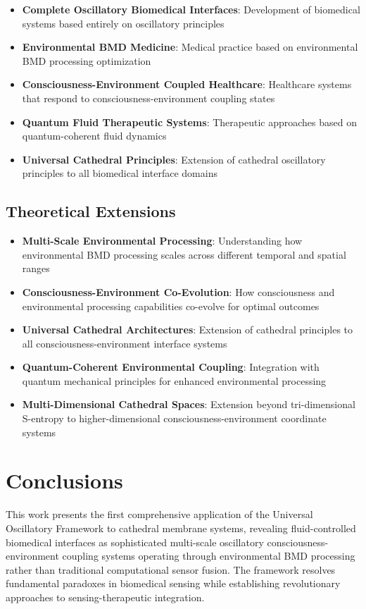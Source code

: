 \documentclass[12pt,a4paper]{article}
\begin{document}
\begin{itemize}
\item \textbf{Complete Oscillatory Biomedical Interfaces}: Development of biomedical systems based entirely on oscillatory principles
\item \textbf{Environmental BMD Medicine}: Medical practice based on environmental BMD processing optimization
\item \textbf{Consciousness-Environment Coupled Healthcare}: Healthcare systems that respond to consciousness-environment coupling states
\item \textbf{Quantum Fluid Therapeutic Systems}: Therapeutic approaches based on quantum-coherent fluid dynamics
\item \textbf{Universal Cathedral Principles}: Extension of cathedral oscillatory principles to all biomedical interface domains
\end{itemize}

\subsection{Theoretical Extensions}

\begin{itemize}
\item \textbf{Multi-Scale Environmental Processing}: Understanding how environmental BMD processing scales across different temporal and spatial ranges
\item \textbf{Consciousness-Environment Co-Evolution}: How consciousness and environmental processing capabilities co-evolve for optimal outcomes
\item \textbf{Universal Cathedral Architectures}: Extension of cathedral principles to all consciousness-environment interface systems
\item \textbf{Quantum-Coherent Environmental Coupling}: Integration with quantum mechanical principles for enhanced environmental processing
\item \textbf{Multi-Dimensional Cathedral Spaces}: Extension beyond tri-dimensional S-entropy to higher-dimensional consciousness-environment coordinate systems
\end{itemize}

\section{Conclusions}

This work presents the first comprehensive application of the Universal Oscillatory Framework to cathedral membrane systems, revealing fluid-controlled biomedical interfaces as sophisticated multi-scale oscillatory consciousness-environment coupling systems operating through environmental BMD processing rather than traditional computational sensor fusion. The framework resolves fundamental paradoxes in biomedical sensing while establishing revolutionary approaches to sensing-therapeutic integration.
\end{document}
